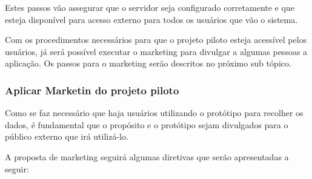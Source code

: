 Estes passos vão assegurar que o servidor seja configurado corretamente e que esteja disponível para acesso externo para
todos os usuários que vão o sistema.

Com os procedimentos necessários para que o projeto piloto esteja acessível pelos usuários, já será possível executar o marketing
para divulgar a algumas pessoas a aplicação. Os passos para o marketing serão descritos no próximo sub tópico.

\subsubsection{Aplicar Marketin do projeto piloto}
\label{sub:definir_tecnologia}
Como se faz necessário que haja usuários utilizando o protótipo para recolher os dados, é fundamental que o propósito
e o protótipo sejam divulgados para o público externo que irá utilizá-lo. 

A proposta de marketing seguirá algumas diretivas que serão apresentadas a seguir:

